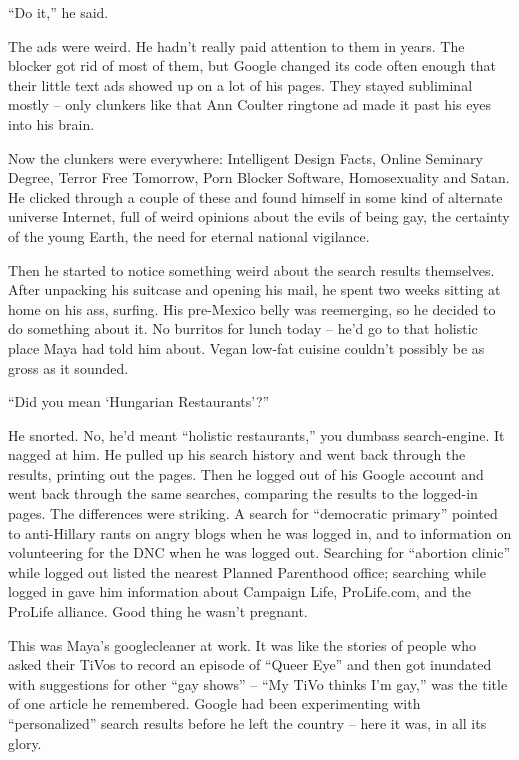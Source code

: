 “Do it,” he said.

\tb

The ads were weird. He hadn't really paid attention to them in years. 
The blocker got rid of most of them, but Google changed its code often 
enough that their little text ads showed up on a lot of his pages. They 
stayed subliminal mostly -- only clunkers like that Ann Coulter 
ringtone ad made it past his eyes into his brain.

Now the clunkers were everywhere: Intelligent Design Facts, Online 
Seminary Degree, Terror Free Tomorrow, Porn Blocker Software, 
Homosexuality and Satan. He clicked through a couple of these and found 
himself in some kind of alternate universe Internet, full of weird 
opinions about the evils of being gay, the certainty of the young 
Earth, the need for eternal national vigilance.

Then he started to notice something weird about the search results 
themselves. After unpacking his suitcase and opening his mail, he spent 
two weeks sitting at home on his ass, surfing. His pre-Mexico belly was 
reemerging, so he decided to do something about it. No burritos for 
lunch today -- he'd go to that holistic place Maya had told him about. 
Vegan low-fat cuisine couldn't possibly be as gross as it sounded.

“Did you mean `Hungarian Restaurants'?”

He snorted. No, he'd meant “holistic restaurants,” you dumbass 
search-engine. It nagged at him. He pulled up his search history and 
went back through the results, printing out the pages. Then he logged 
out of his Google account and went back through the same searches, 
comparing the results to the logged-in pages. The differences were 
striking. A search for “democratic primary” pointed to anti-Hillary 
rants on angry blogs when he was logged in, and to information on 
volunteering for the DNC when he was logged out. Searching for 
“abortion clinic” while logged out listed the nearest Planned 
Parenthood office; searching while logged in gave him information about 
Campaign Life, ProLife.com, and the ProLife alliance. Good thing he 
wasn't pregnant.

This was Maya's googlecleaner at work. It was like the stories of 
people who asked their TiVos to record an episode of “Queer Eye” 
and then got inundated with suggestions for other “gay shows” -- 
“My TiVo thinks I'm gay,” was the title of one article he 
remembered. Google had been experimenting with “personalized” 
search results before he left the country -- here it was, in all its 
glory.

